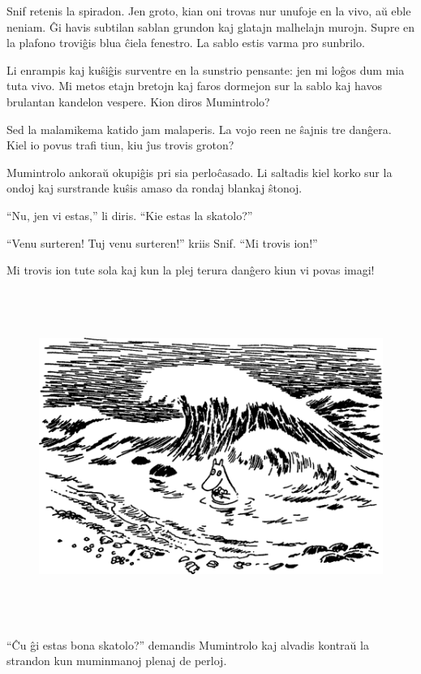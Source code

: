 Snif retenis la spiradon. Jen groto, kian oni trovas nur unufoje en la vivo, aŭ eble neniam. Ĝi havis subtilan sablan grundon kaj glatajn malhelajn murojn. Supre en la plafono troviĝis blua ĉiela fenestro. La sablo estis varma pro sunbrilo.

Li enrampis kaj kuŝiĝis surventre en la sunstrio pensante: jen mi loĝos dum mia tuta vivo. Mi metos etajn bretojn kaj faros dormejon sur la sablo kaj havos brulantan kandelon vespere. Kion diros Mumintrolo?

Sed la malamikema katido jam malaperis.
\sectionbreak
La vojo reen ne ŝajnis tre danĝera. Kiel io povus trafi tiun, kiu ĵus trovis groton?

Mumintrolo ankoraŭ okupiĝis pri sia perloĉasado. Li saltadis kiel korko sur la ondoj kaj surstrande kuŝis amaso da rondaj blankaj ŝtonoj.

``Nu, jen vi estas,'' li diris. ``Kie estas la skatolo?''

``Venu surteren! Tuj venu surteren!'' kriis Snif. ``Mi trovis ion!''

Mi trovis ion tute sola kaj kun la plej terura danĝero kiun vi povas imagi!

\begin{figure}[htbp]
\centering
\includegraphics[width=450pt,height=307pt]{1-8.png}
\caption{}
\label{1-8}
\end{figure}

``Ĉu ĝi estas bona skatolo?'' demandis Mumintrolo kaj alvadis kontraŭ la strandon kun muminmanoj plenaj de perloj.


